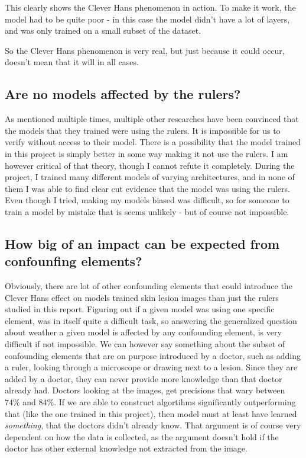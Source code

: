 This clearly shows the Clever Hans phenomenon in action.
To make it work, the model had to be quite poor - in this case the model didn't have a lot of layers,
and was only trained on a small subset of the dataset.

So the Clever Hans phenomenon is very real, but just because it could occur, doesn't mean that it will in all cases.

\subsection{Are no models affected by the rulers?}
As mentioned multiple times, multiple other researches have been convinced that the models that 
they trained were using the rulers.
It is impossible for us to verify without access to their model.
There is a possibility that the model trained in this project is simply better in some way making it not use the rulers.
I am however critical of that theory, though I cannot refute it completely.
During the project, I trained many different models of varying architectures,
and in none of them I was able to find clear cut evidence that the model was using the rulers.
Even though I tried, making my models biased was difficult, 
so for someone to train a model by mistake that is seems unlikely - but of course not impossible.

\subsection{How big of an impact can be expected from confounfing elements?}
Obviously, there are lot of other confounding elements that could introduce the Clever Hans effect on models trained 
skin lesion images than just the rulers studied in this report.
Figuring out if a given model was using one specific element, 
was in itself quite a difficult task, 
so answering the generalized question about weather a given model is affected by any confounding element,
is very difficult if not impossible.
We can however say something about the subset of confounding elements that are on purpose introduced by a doctor, 
such as adding a ruler, looking through a microscope or drawing next to a lesion.
Since they are added by a doctor, they can never provide more knowledge than that doctor already had.
Doctors looking at the images, get precisions that wary between $74\%$ and $84\%$\cite{multiclass-skin-lesion-hybrid}.
If we are able to construct algortihms significantly outperforming that (like the one trained in this project),
then model must at least have learned \textit{something}, that the doctors didn't already know.
That argument is of course very dependent on how the data is collected,
as the argument doesn't hold if the doctor has other external knowledge not extracted from the image.


